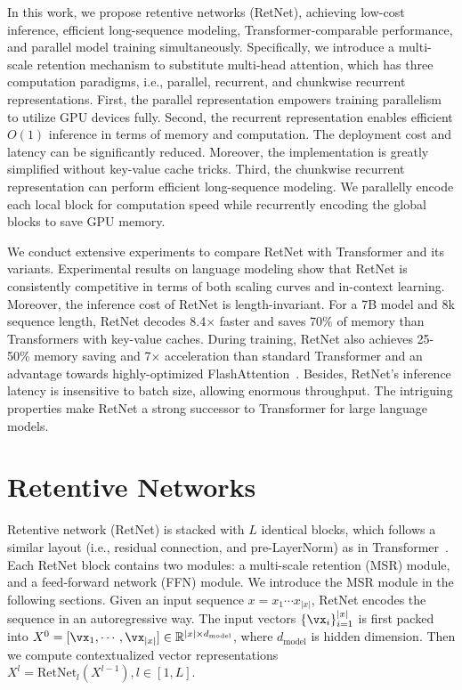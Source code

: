 \documentclass{article}
\newcommand\our{RetNet}
\begin{document}
In this work, we propose retentive networks (\our{}), achieving low-cost inference, efficient long-sequence modeling, Transformer-comparable performance, and parallel model training simultaneously.
Specifically, we introduce a multi-scale retention mechanism to substitute multi-head attention, which has three computation paradigms, i.e., parallel, recurrent, and chunkwise recurrent representations.
First, the parallel representation empowers training parallelism to utilize GPU devices fully.
Second, the recurrent representation enables efficient $O(1)$ inference in terms of memory and computation. The deployment cost and latency can be significantly reduced. Moreover, the implementation is greatly simplified without key-value cache tricks.
Third, the chunkwise recurrent representation can perform efficient long-sequence modeling. We parallelly encode each local block for computation speed while recurrently encoding the global blocks to save GPU memory.

We conduct extensive experiments to compare \our{} with Transformer and its variants.
Experimental results on language modeling show that \our{} is consistently competitive in terms of both scaling curves and in-context learning.
Moreover, the inference cost of \our{} is length-invariant.
For a 7B model and 8k sequence length, \our{} decodes 8.4$\times$ faster and saves 70\% of memory than Transformers with key-value caches.
During training, \our{} also achieves 25-50\% memory saving and 7$\times$ acceleration than standard Transformer and an advantage towards highly-optimized FlashAttention~\cite{flashattention}.
Besides, \our{}'s inference latency is insensitive to batch size, allowing enormous throughput.
The intriguing properties make \our{} a strong successor to Transformer for large language models.

\vfill{}


\section{Retentive Networks}
\label{sec:retnet}

Retentive network (\our{}) is stacked with $L$ identical blocks, which follows a similar layout (i.e., residual connection, and pre-LayerNorm) as in Transformer~\cite{transformer}.
Each \our{} block contains two modules: a multi-scale retention (MSR) module, and a feed-forward network (FFN) module.
We introduce the MSR module in the following sections.
Given an input sequence $x = x_{1} \cdots x_{|x|}$, \our{} encodes the sequence in an autoregressive way.
The input vectors $\{\vx_i\}_{i=1}^{|x|}$ is first packed into $X^0 = [\vx_1, \cdots, \vx_{|x|}] \in \mathbb{R}^{|x|\times d_\text{model}}$, where $d_\text{model}$ is hidden dimension.
Then we compute contextualized vector representations $X^l = \mathrm{RetNet}_{l}(X^{l-1}), l \in [1, L]$.
\end{document}
